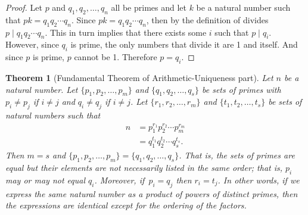 \documentclass[12pt,leqno]{article}
\numberwithin{equation}{section}
\newtheorem{thm}{Theorem}[section]
\theoremstyle{definition}
\begin{document}
\begin{proof}[Proof]
Let $p$ and $q_1, q_2, \hdots, q_n$ all be primes and let $k$ be a natural number such that $p k = q_1q_2 \cdots q_n$.  Since $pk = q_1q_2 \cdots q_n$, then by the definition of divides $p \mid q_1q_2 \cdots q_n$.  This in turn implies that there exists some $i$ such that $p \mid q_i$.  However, since $q_i$ is prime, the only numbers that divide it are 1 and itself.  And since $p$ is prime, $p$ cannot be 1.  Therefore $p = q_i$.
\end{proof}

\pagebreak

\begin{thm}[Fundamental Theorem of Arithmetic-Uniqueness part]
Let $n$ be a natural number.  Let $\{p_1, p_2, \hdots, p_m\}$ and
$\{q_1, q_2, \hdots, q_s\}$ be sets of primes with $p_i \neq p_j$ if
$i \neq j$ and $q_i \neq q_j$ if $i \neq j$. Let $\{r_1, r_2,
\hdots, r_m\}$ and $\{t_1, t_2, \hdots, t_s\}$ be sets of natural
numbers such that
\begin{align*}
n & = p_1^{r_1}p_2^{r_2}\cdots p_m^{r_m} \\
  & = q_1^{t_1}q_2^{t_2}\cdots q_s^{t_s}.
\end{align*}
Then $m = s$ and $\{p_1, p_2, \hdots, p_m\} = \{q_1, q_2, \hdots,
q_s\}$. That is, the sets of primes are equal but their elements are
not necessarily listed in the same order; that is, $p_i$ may or may
not equal $q_i$.  Moreover, if~$p_i = q_j$ then $r_i = t_j$.  In
other words, if we express the same natural number as a product of
powers of distinct primes, then the expressions are identical except
for the ordering of the factors.
\end{thm}
\end{document}

